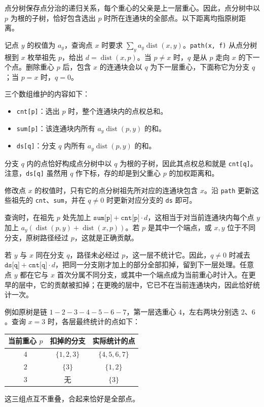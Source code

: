 点分树保存点分治的递归关系，每个重心的父亲是上一层重心。因此，点分树中以 $p$ 为根的子树，恰好包含选出 $p$ 时所在连通块的全部点。以下距离均指原树距离。

记点 $y$ 的权值为 $a_y$，查询点 $x$ 时要求 $\sum_y a_y\operatorname{dist}(x,y)$。\texttt{path(x, f)} 从点分树根到 $x$ 枚举祖先 $p$，给出 $d=\operatorname{dist}(x,p)$。当 $p\ne x$ 时，$q$ 是从 $p$ 走向 $x$ 的下一个点。删除重心 $p$ 后，包含 $x$ 的连通块会以 $q$ 为下一层重心，下面称它为分支 $q$；当 $p=x$ 时，$q=0$。

三个数组维护的内容如下：
\begin{itemize}
  \item \texttt{cnt[p]}：选出 $p$ 时，整个连通块内的点权总和。
  \item \texttt{sum[p]}：该连通块内所有 $a_y\operatorname{dist}(p,y)$ 的和。
  \item \texttt{ds[q]}：分支 $q$ 内所有 $a_y\operatorname{dist}(p,y)$ 的和。
\end{itemize}
分支 $q$ 内的点恰好构成点分树中以 $q$ 为根的子树，因此其点权总和就是 \texttt{cnt[q]}。注意，\texttt{ds[q]} 虽然用 $q$ 作下标，存的却是到父重心 $p$ 的加权距离和。

修改点 $x$ 的权值时，只有它的点分树祖先所对应的连通块包含 $x$。沿 \texttt{path} 更新这些祖先的 \texttt{cnt}、\texttt{sum}，并在 $q\ne 0$ 时更新对应分支的 \texttt{ds} 即可。

查询时，在祖先 $p$ 处先加上 $\texttt{sum[p]}+\texttt{cnt[p]}\cdot d$，这相当于对当前连通块内每个点 $y$ 加上 $a_y(\operatorname{dist}(p,y)+\operatorname{dist}(x,p))$。若 $p$ 是其中一个端点，或 $x,y$ 位于不同分支，原树路径经过 $p$，这就是正确贡献。

若 $y$ 与 $x$ 同在分支 $q$，路径未必经过 $p$，这一层不统计它。因此，$q\ne 0$ 时减去 $\texttt{ds[q]}+\texttt{cnt[q]}\cdot d$，把同一分支刚才加上的部分全部扣掉，留到下一层处理。任意点 $y$ 都在它与 $x$ 首次分属不同分支，或其中一个端点成为当前重心时计入。在更早的层中，它的贡献被扣掉；在更晚的层中，它已不在当前连通块内，因此恰好统计一次。

例如原树是链 $1-2-3-4-5-6-7$，第一层选重心 $4$，左右两块分别选 $2$、$6$。查询 $x=3$ 时，各层最终统计的点如下：
\begin{center}
\begin{tabular}{c|c|c}
当前重心 $p$ & 扣掉的分支 & 实际统计的点 \\
\hline
$4$ & $\{1,2,3\}$ & $\{4,5,6,7\}$ \\
$2$ & $\{3\}$ & $\{1,2\}$ \\
$3$ & 无 & $\{3\}$
\end{tabular}
\end{center}
这三组点互不重叠，合起来恰好是全部点。
